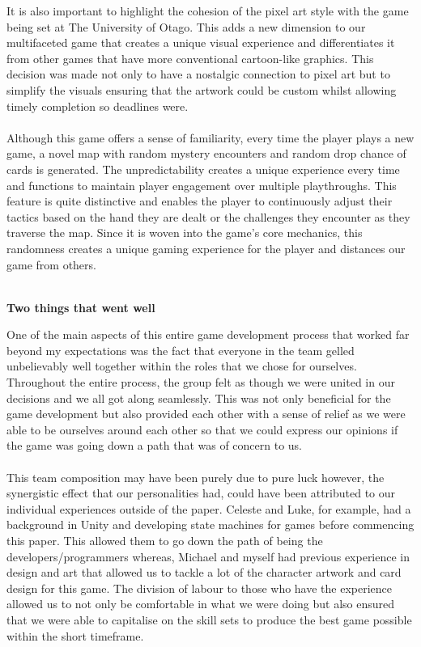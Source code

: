 \documentclass[a4paper]{article}
\begin{document}
It is also important to highlight the cohesion of the pixel art style with the game being set at The University of Otago. This adds a new dimension to our multifaceted game that creates a unique visual experience and differentiates it from other games that have more conventional cartoon-like graphics. This decision was made not only to have a nostalgic connection to pixel art but to simplify the visuals ensuring that the artwork could be custom whilst allowing timely completion so deadlines were. 
\\\\
Although this game offers a sense of familiarity, every time the player plays a new game, a novel map with random mystery encounters and random drop chance of cards is generated. The unpredictability creates a unique experience every time and functions to maintain player engagement over multiple playthroughs. This feature is quite distinctive and enables the player to continuously adjust their tactics based on the hand they are dealt or the challenges they encounter as they traverse the map. Since it is woven into the game’s core mechanics, this randomness creates a unique gaming experience for the player and distances our game from others.
\\\\
\begin{center}
{\large \textbf{Two things that went well}}
\end{center}
One of the main aspects of this entire game development process that worked far beyond my expectations was the fact that everyone in the team gelled unbelievably well together within the roles that we chose for ourselves. Throughout the entire process, the group felt as though we were united in our decisions and we all got along seamlessly. This was not only beneficial for the game development but also provided each other with a sense of relief as we were able to be ourselves around each other so that we could express our opinions if the game was going down a path that was of concern to us. 
\\\\
This team composition may have been purely due to pure luck however, the synergistic effect that our personalities had, could have been attributed to our individual experiences outside of the paper. Celeste and Luke, for example, had a background in Unity and developing state machines for games before commencing this paper. This allowed them to go down the path of being the developers/programmers whereas, Michael and myself had previous experience in design and art that allowed us to tackle a lot of the character artwork and card design for this game. The division of labour to those who have the experience allowed us to not only be comfortable in what we were doing but also ensured that we were able to capitalise on the skill sets to produce the best game possible within the short timeframe. 
\end{document}
